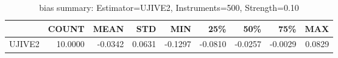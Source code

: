 \begin{table}[ht]
\centering
\caption{bias summary: Estimator=UJIVE2, Instruments=500, Strength=0.10}
\begin{tabular}{lrrrrrrrr}
\toprule
 & COUNT & MEAN & STD & MIN & 25\% & 50\% & 75\% & MAX \\
\midrule
UJIVE2 & 10.0000 & -0.0342 & 0.0631 & -0.1297 & -0.0810 & -0.0257 & -0.0029 & 0.0829 \\
\bottomrule
\end{tabular}
\end{table}
